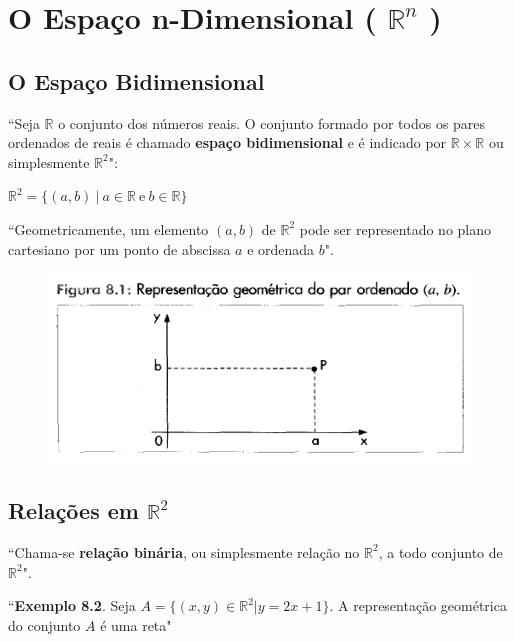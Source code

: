 \section{O Espaço n-Dimensional ( $ \mathbb{R}^{n} $ )}

	\subsection{O Espaço Bidimensional \cite{morettin}}

		``Seja $\mathbb{R}$ o conjunto dos números reais. O conjunto formado por todos os pares ordenados de reais é chamado \textbf{espaço bidimensional} e é indicado por $\mathbb{R} \times \mathbb{R}$ ou simplesmente $\mathbb{R}^{2}$":

		\bigskip

		{\LARGE $\mathbb{R}^{2} = \{(a, b) \ | \ a \in \mathbb{R} \ \text{e} \ b \in \mathbb{R} \}$}
		
		\bigskip		
		
		``Geometricamente, um elemento $(a, b)$ de $\mathbb{R}^{2}$ pode ser representado no plano cartesiano por um ponto de abscissa $a$ e ordenada $b$".		
		
		\begin{figure}[H]
			\includegraphics[height=5cm]{images/morettin_figura-8-1}
		\end{figure}
		
	\subsection{Relações em $\mathbb{R}^{2}$ \cite{morettin}}
	
		``Chama-se \textbf{relação binária}, ou simplesmente relação no $\mathbb{R}^{2}$, a todo conjunto de $\mathbb{R}^{2}$".

		\bigskip

		``\textbf{Exemplo 8.2}. Seja $A = \{(x, y) \in \mathbb{R}^{2} | y = 2x + 1 \}$. A representação geométrica do conjunto $A$ é uma reta"

